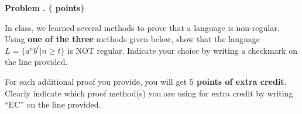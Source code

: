 




\newpage
\addtocounter{problemctr}{1}
\noindent
{\bf
Problem \theproblemctr.  (\themorealessb \xspace points)}
\swallow{ (\themorealessbtime\xspace minutes)}

\smallskip

\noindent
In class, we learned several methods to prove that a language is non-regular. Using \textbf{one of the three} methods given below, show that the language $L = \{a^nb^t | n \ge t\}$ is NOT regular. Indicate your choice by writing a checkmark on the line provided.

\bigskip

For each additional proof you provide, you will get \textbf{$5$ points of extra credit}. Clearly indicate which proof method(s) you are using for extra credit by writing ``EC'' on the line provided.

\bigskip

